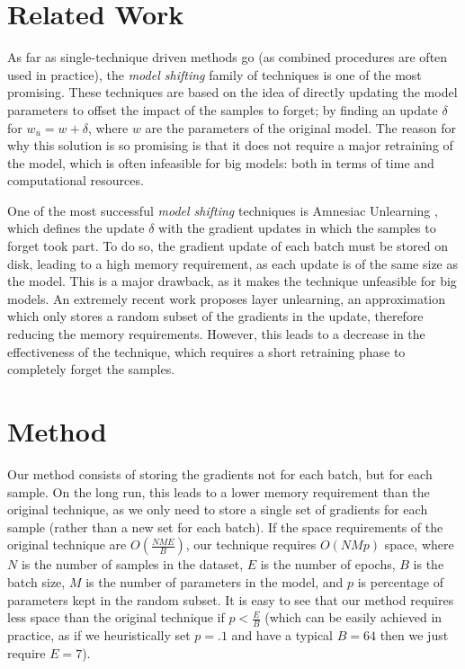 \documentclass{article}
\begin{document}
\section{Related Work}
As far as single-technique driven methods go (as combined procedures are often used in practice), the \emph{model shifting} \cite{xu2023survey} family of techniques is one of the most promising. These techniques are based on the idea of directly updating the model parameters to offset the impact of the samples to forget; by finding an update $\delta$ for $w_u=w+\delta$, where $w$ are the parameters of the original model. The reason for why this solution is so promising is that it does not require a major retraining of the model, which is often infeasible for big models: both in terms of time and computational resources.

One of the most successful \emph{model shifting} techniques is Amnesiac Unlearning \cite{graves2021amnesiac}, which defines the update $\delta$ with the gradient updates in which the samples to forget took part. To do so, the gradient update of each batch must be stored on disk, leading to a high memory requirement, as each update is of the same size as the model. This is a major drawback, as it makes the technique unfeasible for big models.
An extremely recent work \cite{gogineni2024efficient} proposes layer unlearning, an approximation which only stores a random subset of the gradients in the update, therefore reducing the memory requirements. However, this leads to a decrease in the effectiveness of the technique, which requires a short retraining phase to completely forget the samples.

\section{Method}
Our method consists of storing the gradients not for each batch, but for each sample. On the long run, this leads to a lower memory requirement than the original technique, as we only need to store a single set of gradients for each sample (rather than a new set for each batch). If the space requirements of the original technique are $O(\frac{NME}{B})$, our technique requires $O(NMp)$ space, where $N$ is the number of samples in the dataset, $E$ is the number of epochs, $B$ is the batch size, $M$ is the number of parameters in the model, and $p$ is percentage of parameters kept in the random subset. It is easy to see that our method requires less space than the original technique if $p<\frac{E}{B}$ (which can be easily achieved in practice, as if we heuristically set $p=.1$ and have a typical $B=64$ then we just require $E=7$).
\end{document}
